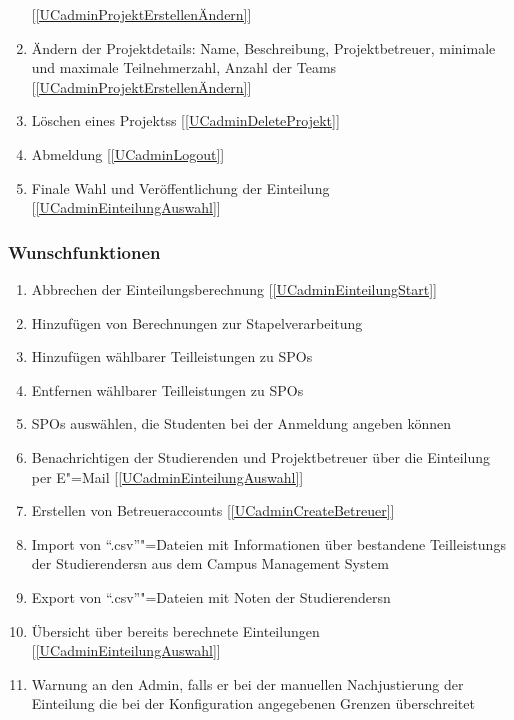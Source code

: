 \documentclass[parskip=full]{scrartcl}
\newcommand{\swtLabel}[1]{\textbf{/#1\arabic*0/}}
\newcommand{\testRef}[1]{[\ref{#1}]}
\begin{document}
\begin{enumerate}[label=\swtLabel{FA}, resume]
  \testRef{UCadminProjektErstellenÄndern}
  \item Ändern der Projektdetails: Name, Beschreibung, Projektbetreuer, %
        minimale und maximale Teilnehmerzahl, Anzahl der Teams
        \label{FAadminProjektänderung} \testRef{UCadminProjektErstellenÄndern}
  \item Löschen eines \glspl{Projekt}s \label{FAadminDeleteProjekt}
  \testRef{UCadminDeleteProjekt}
  \item Abmeldung \label{FAadminAbmeldung} \testRef{UCadminLogout}
  \item Finale Wahl und Veröffentlichung der Einteilung \label{FAadminAuswahl}
  \testRef{UCadminEinteilungAuswahl}
\end{enumerate}

\subsubsection{Wunschfunktionen}

\begin{enumerate}[label=\swtLabel{FA}, resume]
  \item Abbrechen der Einteilungsberechnung \label{FAabbruch} \testRef{UCadminEinteilungStart}
  \item Hinzufügen von Berechnungen zur Stapelverarbeitung \label{FAadminStapel}
  \item Hinzufügen wählbarer Teilleistungen zu \glspl{SPO} \label{FAadminSPOhinzufügen}
  \item Entfernen wählbarer Teilleistungen zu \glspl{SPO} \label{FAadminSPOentfernen}
  \item \glspl{SPO} auswählen, die Studenten bei der Anmeldung angeben können
  \label{FAadminSPOAuswahl}
  \item Benachrichtigen der Studierenden und Projektbetreuer über die Einteilung
  per E"=Mail \label{FAadminBenachrichtigen} \testRef{UCadminEinteilungAuswahl}
  \item Erstellen von Betreueraccounts \label{FAadminCreateAccounts}
  \testRef{UCadminCreateBetreuer}
  \item Import von \enquote{.csv}"=Dateien mit Informationen über bestandene
  \glspl{Teilleistung} der \glspl{Studierender}n aus dem Campus Management System 
  \label{FAimport2}
  \item Export von \enquote{.csv}"=Dateien mit Noten der \glspl{Studierender}n
  \label{FAexport2}
  \item Übersicht über bereits berechnete Einteilungen
  \label{FAadminUebersichtAlleEinteilungen} \testRef{UCadminEinteilungAuswahl}
  \item Warnung an den \gls{Admin}, falls er bei der manuellen Nachjustierung 
  der Einteilung die bei der Konfiguration angegebenen Grenzen überschreitet
  \label{FAadminWarnung}
\end{enumerate}
\end{document}
